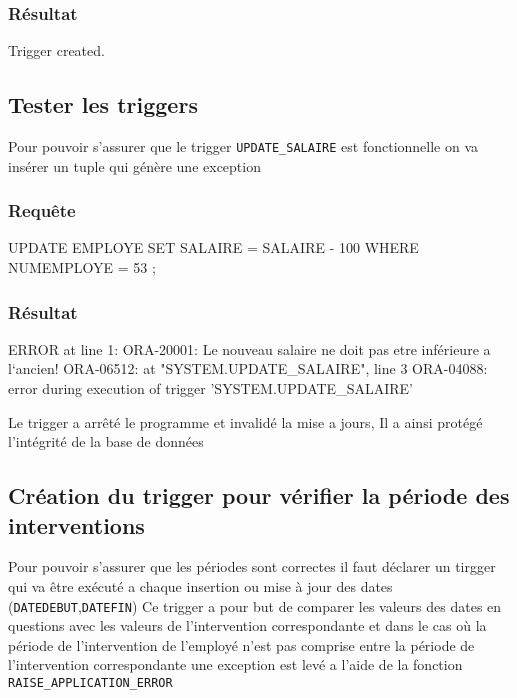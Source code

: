 \documentclass[•]{article}
\begin{document}
\subsubsection{Résultat}
\begin{sql}
Trigger created.
\end{sql}

\subsection{Tester les triggers}
Pour pouvoir s'assurer que le trigger \texttt{UPDATE\_SALAIRE} est fonctionnelle on va insérer un tuple qui génère une exception
\subsubsection{Requête}
\begin{sql}
UPDATE EMPLOYE SET SALAIRE = SALAIRE - 100 WHERE NUMEMPLOYE = 53 ;
\end{sql}

\subsubsection{Résultat}
\begin{sql}
ERROR at line 1:
ORA-20001: Le nouveau salaire ne doit pas etre inférieure a l`ancien!
ORA-06512: at "SYSTEM.UPDATE_SALAIRE", line 3
ORA-04088: error during execution of trigger 'SYSTEM.UPDATE_SALAIRE'
\end{sql}

Le trigger a arrêté le programme et invalidé la mise a jours, Il a ainsi protégé l'intégrité de la base de données

\subsection{Création du trigger pour vérifier la période des interventions}

Pour pouvoir s'assurer que les périodes sont correctes il faut déclarer un tirgger qui va être exécuté a chaque insertion ou mise à jour des dates (\texttt{DATEDEBUT},\texttt{DATEFIN})
Ce trigger a pour but de comparer les valeurs des dates en questions avec les valeurs de l'intervention correspondante 
et dans le cas où la période de l'intervention de l'employé n'est pas comprise entre la période de l'intervention correspondante une exception est levé
a l'aide de la fonction \texttt{RAISE\_APPLICATION\_ERROR}
\end{document}
